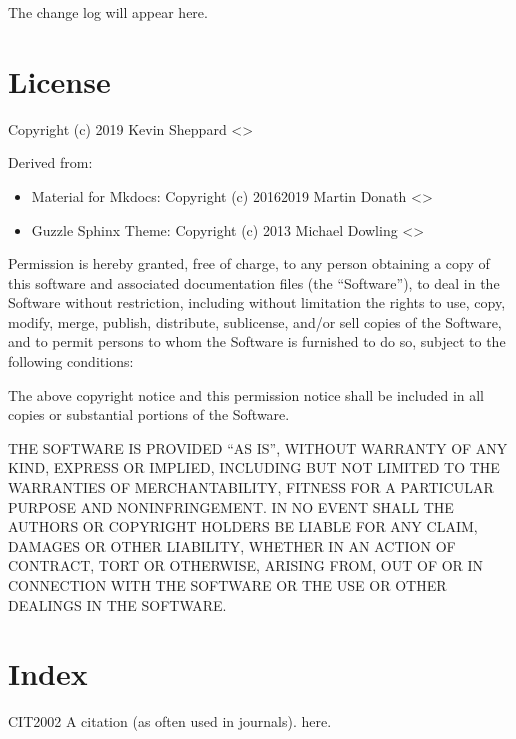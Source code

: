 \documentclass[letterpaper,10pt,english]{sphinxmanual}
\begin{document}
The change log will appear here.


\section{License}
\label{\detokenize{license:license}}\label{\detokenize{license::doc}}
Copyright (c) 2019 Kevin Sheppard <>

Derived from:
\begin{itemize}
\item {} 
Material for Mkdocs: Copyright (c) 2016\sphinxhyphen{}2019 Martin Donath <>

\item {} 
Guzzle Sphinx Theme: Copyright (c) 2013 Michael Dowling <>

\end{itemize}

Permission is hereby granted, free of charge, to any person obtaining a copy
of this software and associated documentation files (the “Software”), to deal
in the Software without restriction, including without limitation the rights
to use, copy, modify, merge, publish, distribute, sublicense, and/or sell
copies of the Software, and to permit persons to whom the Software is furnished
to do so, subject to the following conditions:

The above copyright notice and this permission notice shall be included in all
copies or substantial portions of the Software.

THE SOFTWARE IS PROVIDED “AS IS”, WITHOUT WARRANTY OF ANY KIND, EXPRESS OR
IMPLIED, INCLUDING BUT NOT LIMITED TO THE WARRANTIES OF MERCHANTABILITY, FITNESS
FOR A PARTICULAR PURPOSE AND NONINFRINGEMENT. IN NO EVENT SHALL THE AUTHORS OR
COPYRIGHT HOLDERS BE LIABLE FOR ANY CLAIM, DAMAGES OR OTHER LIABILITY, WHETHER
IN AN ACTION OF CONTRACT, TORT OR OTHERWISE, ARISING FROM, OUT OF OR IN CONNECTION
WITH THE SOFTWARE OR THE USE OR OTHER DEALINGS IN THE SOFTWARE.


\section{Index}
\label{\detokenize{index:index}}

\begin{sphinxthebibliography}{CIT2002}
A citation
(as often used in journals).
here.
\end{sphinxthebibliography}



\renewcommand{\indexname}{Index}
\footnotesize\raggedright\printindex
\end{document}
